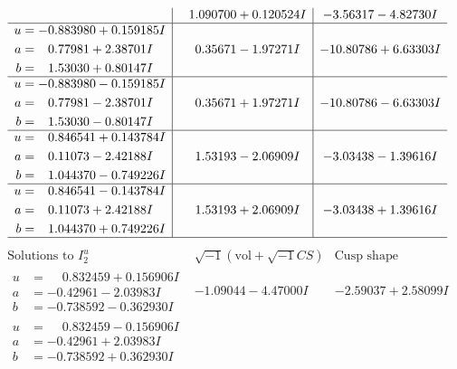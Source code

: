 \documentclass[1p]{elsarticle_modified}
\theoremstyle{definition}
\newcommand{\I}{\sqrt{-1}}
\begin{document}
$$\begin{array}{c|c|c}
 & \phantom{-}1.090700 + 0.120524 I & -3.56317 - 4.82730 I \\ \hline\begin{aligned}
u &= -0.883980 + 0.159185 I \\
a &= \phantom{-}0.77981 + 2.38701 I \\
b &= \phantom{-}1.53030 + 0.80147 I\end{aligned}
 & \phantom{-}0.35671 - 1.97271 I & -10.80786 + 6.63303 I \\ \hline\begin{aligned}
u &= -0.883980 - 0.159185 I \\
a &= \phantom{-}0.77981 - 2.38701 I \\
b &= \phantom{-}1.53030 - 0.80147 I\end{aligned}
 & \phantom{-}0.35671 + 1.97271 I & -10.80786 - 6.63303 I \\ \hline\begin{aligned}
u &= \phantom{-}0.846541 + 0.143784 I \\
a &= \phantom{-}0.11073 - 2.42188 I \\
b &= \phantom{-}1.044370 - 0.749226 I\end{aligned}
 & \phantom{-}1.53193 - 2.06909 I & -3.03438 - 1.39616 I \\ \hline\begin{aligned}
u &= \phantom{-}0.846541 - 0.143784 I \\
a &= \phantom{-}0.11073 + 2.42188 I \\
b &= \phantom{-}1.044370 + 0.749226 I\end{aligned}
 & \phantom{-}1.53193 + 2.06909 I & -3.03438 + 1.39616 I\\
 \hline 
 \end{array}$$\newpage$$\begin{array}{c|c|c}  
\text{Solutions to }I^u_{2}& \I (\text{vol} + \sqrt{-1}CS) & \text{Cusp shape}\\
 \hline 
\begin{aligned}
u &= \phantom{-}0.832459 + 0.156906 I \\
a &= -0.42961 - 2.03983 I \\
b &= -0.738592 - 0.362930 I\end{aligned}
 & -1.09044 - 4.47000 I & -2.59037 + 2.58099 I \\ \hline\begin{aligned}
u &= \phantom{-}0.832459 - 0.156906 I \\
a &= -0.42961 + 2.03983 I \\
b &= -0.738592 + 0.362930 I\end{aligned}

\end{array}$$
\end{document}
